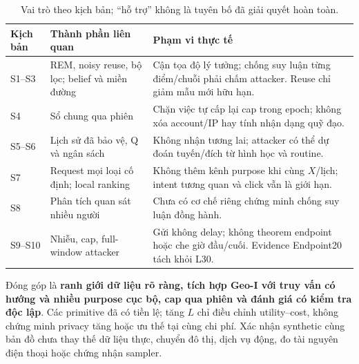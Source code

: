 \begin{table}[htbp]\centering\small
\caption{Vai trò theo kịch bản; ``hỗ trợ'' không là tuyên bố đã giải quyết hoàn toàn.}
\begin{tabularx}{\textwidth}{P{2.0cm}P{4.2cm}Y}\toprule
Kịch bản & Thành phần liên quan & Phạm vi thực tế\\\midrule
S1--S3 & REM, noisy reuse, bộ lọc; belief và miền đường & Cận tọa độ lý tưởng; chống suy luận từng điểm/chuỗi phải chấm attacker. Reuse chỉ giảm mẫu mới hữu hạn.\\
S4 & Sổ chung qua phiên & Chặn việc tự cấp lại cap trong epoch; không xóa account/IP hay tính nhận dạng quỹ đạo.\\
S5--S6 & Lịch sử đã bảo vệ, Q và ngân sách & Không nhận tương lai; attacker có thể dự đoán tuyến/đích từ hình học và routine.\\
S7 & Request mọi loại cố định; local ranking & Không thêm kênh purpose khi cùng $X$/lịch; intent tương quan và click vẫn là giới hạn.\\
S8 & Phân tích quan sát nhiều người & Chưa có cơ chế riêng chứng minh chống suy luận đồng hành.\\
S9--S10 & Nhiễu, cap, full-window attacker & Gửi không delay; không theorem endpoint hoặc che giờ đầu/cuối. Evidence Endpoint20 tách khỏi L30.\\\bottomrule
\end{tabularx}
\end{table}

Đóng góp là \textbf{ranh giới dữ liệu rõ ràng, tích hợp Geo-I với truy vấn có hướng và nhiều purpose cục bộ, cap qua phiên và đánh giá có kiểm tra độc lập}. Các primitive đã có tiền lệ; tăng $L$ chỉ điều chỉnh utility--cost, không chứng minh privacy tăng hoặc ưu thế tại cùng chi phí. Xác nhận synthetic cùng bản đồ chưa thay thế dữ liệu thực, chuyển đô thị, dịch vụ động, đo tài nguyên điện thoại hoặc chứng nhận sampler.
